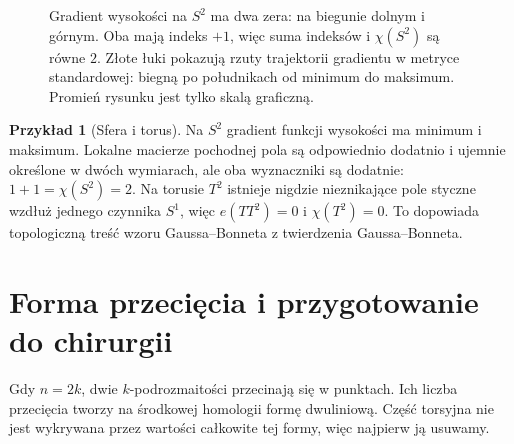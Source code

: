 \documentclass[11pt,a4paper,oneside]{report}
\theoremstyle{plain}
\theoremstyle{definition}
\newtheorem{przyklad}[twierdzenie]{Przykład}
\theoremstyle{remark}
\begin{document}
\begin{figure}[htbp]
\centering
{}
\caption{Gradient wysokości na $S^2$
ma dwa zera: na biegunie dolnym
i górnym. Oba mają indeks $+1$,
więc suma indeksów i $\chi(S^2)$ są równe $2$.
Złote łuki pokazują rzuty trajektorii gradientu
w metryce standardowej: biegną po południkach od minimum
do maksimum. Promień rysunku jest tylko skalą graficzną.}
\label{fig:poincare-hopf-16}
\end{figure}

\begin{przyklad}[Sfera i torus]
Na $S^2$ gradient
funkcji wysokości
ma minimum i maksimum.
Lokalne macierze
pochodnej pola są
odpowiednio dodatnio
i ujemnie określone
w dwóch wymiarach,
ale oba wyznaczniki
są dodatnie:
$1+1=\chi(S^2)=2$.
Na torusie $T^2$
istnieje nigdzie
nieznikające pole
styczne wzdłuż
jednego czynnika
$S^1$, więc
$e(TT^2)=0$ i
$\chi(T^2)=0$.
To dopowiada topologiczną
treść wzoru
Gaussa--Bonneta z twierdzenia Gaussa--Bonneta.
\end{przyklad}

\section{Forma przecięcia i przygotowanie do chirurgii}
\label{sec:forma-przeciecia-16}

Gdy $n=2k$, dwie
$k$-podrozmaitości
przecinają się
w punktach.
Ich liczba przecięcia
tworzy na środkowej
homologii formę
dwuliniową. Część
torsyjna nie jest
wykrywana przez
wartości całkowite
tej formy, więc
najpierw ją usuwamy.
\end{document}
